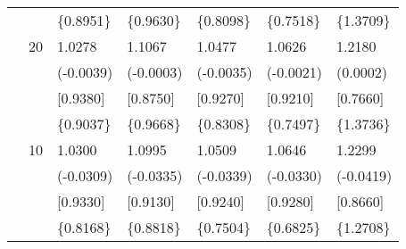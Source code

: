 \begin{table}[ht]
\begin{tabular}{lllllll}
&&\{0.8951\}&\{0.9630\}&\{0.8098\}&\{0.7518\}&\{1.3709\}\\
&20&1.0278&1.1067&1.0477&1.0626&1.2180\\
&&(-0.0039)&(-0.0003)&(-0.0035)&(-0.0021)&(0.0002)\\
&&[0.9380]&[0.8750]&[0.9270]&[0.9210]&[0.7660]\\
&&\{0.9037\}&\{0.9668\}&\{0.8308\}&\{0.7497\}&\{1.3736\}\\
&10&1.0300&1.0995&1.0509&1.0646&1.2299\\
&&(-0.0309)&(-0.0335)&(-0.0339)&(-0.0330)&(-0.0419)\\
&&[0.9330]&[0.9130]&[0.9240]&[0.9280]&[0.8660]\\
&&\{0.8168\}&\{0.8818\}&\{0.7504\}&\{0.6825\}&\{1.2708\}\\
\hline
\end{tabular}
\end{table}

